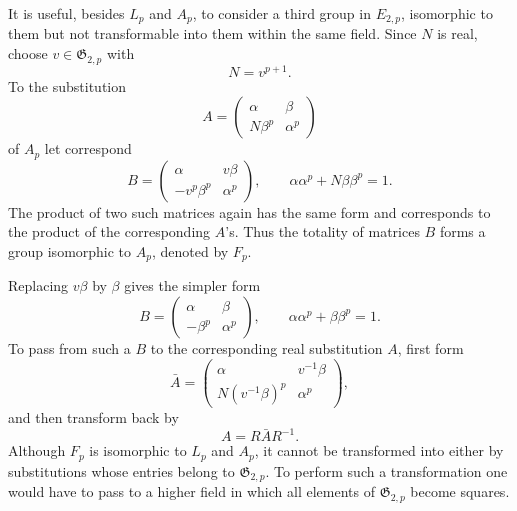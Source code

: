 \documentclass[11pt]{article}
\begin{document}
It is useful, besides \(L_p\) and \(A_p\), to consider a third group in \(E_{2,p}\), isomorphic to them but not transformable into them within the same field.  Since \(N\) is real, choose \(v\in\mathfrak G_{2,p}\) with
\[
 N=v^{p+1}.
\]
To the substitution
\[
 A=\begin{pmatrix}\alpha&\beta\\N\beta^p&\alpha^p\end{pmatrix}
\]
of \(A_p\) let correspond
\begin{equation}\label{eq:69-13}
 B=\begin{pmatrix}\alpha&v\beta\\-v^p\beta^p&\alpha^p\end{pmatrix},
 \qquad \alpha\alpha^p+N\beta\beta^p=1.
\end{equation}
The product of two such matrices again has the same form and corresponds to the product of the corresponding \(A\)'s.  Thus the totality of matrices \(B\) forms a group isomorphic to \(A_p\), denoted by \(F_p\).

Replacing \(v\beta\) by \(\beta\) gives the simpler form
\begin{equation}\label{eq:69-14}
 B=\begin{pmatrix}\alpha&\beta\\-\beta^p&\alpha^p\end{pmatrix},
 \qquad \alpha\alpha^p+\beta\beta^p=1.
\end{equation}
To pass from such a \(B\) to the corresponding real substitution \(A\), first form
\begin{equation}\label{eq:69-15}
 \bar A=\begin{pmatrix}\alpha&v^{-1}\beta\\N(v^{-1}\beta)^p&\alpha^p\end{pmatrix},
\end{equation}
and then transform back by
\begin{equation}\label{eq:69-16}
 A=R\bar A R^{-1}.
\end{equation}
Although \(F_p\) is isomorphic to \(L_p\) and \(A_p\), it cannot be transformed into either by substitutions whose entries belong to \(\mathfrak G_{2,p}\).  To perform such a transformation one would have to pass to a higher field in which all elements of \(\mathfrak G_{2,p}\) become squares.
\end{document}
